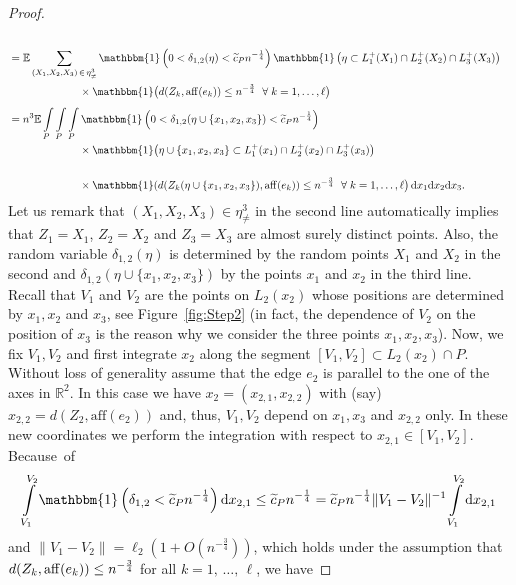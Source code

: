 \documentclass[AHL,Unicode,longabstracts,published]{cedram}
\newcommand{\ind}{\mathbbm{1}}
\newcommand{\bbR}{\mathbb{R}}
\newcommand{\bbE}{\mathbb{E}}
\newcommand{\aff}{\mathrm{aff}}
\let\oldtilde\tilde
\renewcommand*{\tilde}[1]{\mathchoice{\widetilde{#1}}{\widetilde{#1}}{\oldtilde{#1}}{\oldtilde{#1}}}
\let\oldforall\forall
\renewcommand*{\forall}{\mathrel{\oldforall}}
\begin{document}
\begin{proof}
\begin{align*}
\\
& =
\bbE \sum_{(X_1, X_2,X_3)\,\in\,\eta_{\neq}^3} \ind \left(0<\delta_{1,2}(\eta)< \tilde c_P n^{- \frac 14}\right) \ind\left(\eta \subset L_1^+(X_1) \cap L_2^+ (X_2)\cap L_3^+ (X_3)\right)\\
&\hspace{2.3cm}\times
\ind\big(d(Z_k, \aff(e_k)) \leq n^{- \frac 34}\ \forall k=1,\ldots,\ell \big)
\\[1ex] &= n^3 \bbE \int\limits_{P}\int\limits_{P}\int\limits_{P} \ind\left(0<\delta_{1,2}(\eta\cup\{x_1,x_2,x_3\}) < \tilde c_P n^{- \frac 14}\right)
\\ &\hspace{2.3cm}\times
\ind \big(\eta\cup\{x_1,x_2,x_3\} \subset L_1^+(x_1) \cap L_2^+ (x_2)\cap L_3^+ (x_3)\big)\\
\\ &\hspace{2.3cm}\times
\ind(d(Z_k(\eta\cup\{x_1,x_2,x_3\}), \aff(e_k)) \leq n^{- \frac 34}\ \forall k=1,\ldots,\ell \big) \,\mathrm{d} x_1\mathrm{d} x_2\mathrm{d} x_3.
\end{align*}
Let us remark that $(X_1, X_2,X_3) \in \eta_{\neq}^3$ in the second line automatically implies that $Z_1=X_1$, $Z_2=X_2$ and $Z_3=X_3$ are almost surely distinct points. Also, the random variable $\delta_{1,2}(\eta)$ is determined by the random points $X_1$ and $X_2$ in the second and $\delta_{1,2}(\eta\cup\{x_1,x_2,x_3\})$ by the points $x_1$ and $x_2$ in the third line. Recall that $V_1$ and $V_2$ are the points on $L_2(x_2)$ whose positions are determined by $x_1,x_2$ and $x_3$, see Figure~\ref{fig:Step2} (in fact, the dependence of $V_2$ on the position of $x_3$ is the reason why we consider the three points $x_1,x_2,x_3$). Now, we fix $V_1, V_2$ and first integrate $x_2$ along the segment $[V_1, V_2] \subset L_2(x_2) \cap P$. Without loss of generality assume that the edge $e_2$ is parallel to the one of the axes in $\bbR^2$. In this case we have $x_2=(x_{2,1},x_{2,2})$ with (say) $x_{2,2}=d(Z_2,\aff(e_2))$ and, thus, $V_1,V_2$ depend on $x_1,x_3$ and $x_{2,2}$ only. In these new coordinates we perform the integration with respect to $x_{2,1}\in [V_1, V_2]$. Because~of
\[
\int\limits_{V_1}^{V_2} \ind\left(\delta_{1,2} <\tilde c_P n^{- \frac 14}\right) \mathrm{d} x_{2,1}
\leq
\tilde c_P n^{- \frac 14} =
\tilde c_P n^{- \frac 14} \| V_1-V_2 \|^{-1} \int\limits_{V_1}^{V_2} \mathrm{d} x_{2,1}
\]
and $\| V_1-V_2 \| = \ell_2(1+O(n^{- \frac 34}))$, which holds under the assumption that $d(Z_k, \aff(e_k))\linebreak \leq n^{- \frac 34}$ for all $k=1,\,\ldots,\,\ell$, we have

\end{proof}
\end{document}
